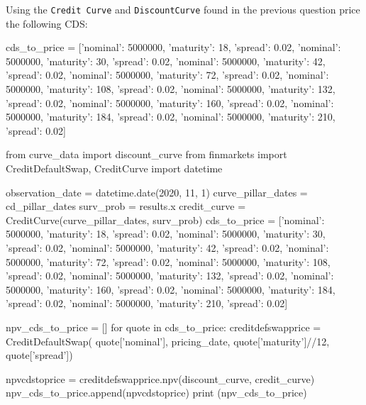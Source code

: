 \cprotEnv\begin{question}
Using the \texttt{Credit\ Curve} and \texttt{DiscountCurve} found in the previous question price the following CDS:

\begin{ipython}
cds_to_price = [{'nominal': 5000000, 'maturity': 18, 'spread': 0.02},
                {'nominal': 5000000, 'maturity': 30, 'spread': 0.02},
                {'nominal': 5000000, 'maturity': 42, 'spread': 0.02},
                {'nominal': 5000000, 'maturity': 72, 'spread': 0.02},
                {'nominal': 5000000, 'maturity': 108, 'spread': 0.02},
                {'nominal': 5000000, 'maturity': 132, 'spread': 0.02},
                {'nominal': 5000000, 'maturity': 160, 'spread': 0.02},
                {'nominal': 5000000, 'maturity': 184, 'spread': 0.02},
                {'nominal': 5000000, 'maturity': 210, 'spread': 0.02}]
\end{ipython}
\end{question}

\cprotEnv\begin{solution}
\begin{ipython}
from curve_data import discount_curve
from finmarkets import CreditDefaultSwap, CreditCurve
import datetime

observation_date = datetime.date(2020, 11, 1)
curve_pillar_dates = cd_pillar_dates
surv_prob = results.x
credit_curve = CreditCurve(curve_pillar_dates, surv_prob)
cds_to_price = [{'nominal': 5000000, 'maturity': 18, 'spread': 0.02},
                {'nominal': 5000000, 'maturity': 30, 'spread': 0.02},
                {'nominal': 5000000, 'maturity': 42, 'spread': 0.02},
                {'nominal': 5000000, 'maturity': 72, 'spread': 0.02},
                {'nominal': 5000000, 'maturity': 108, 'spread': 0.02},
                {'nominal': 5000000, 'maturity': 132, 'spread': 0.02},
                {'nominal': 5000000, 'maturity': 160, 'spread': 0.02},
                {'nominal': 5000000, 'maturity': 184, 'spread': 0.02},
                {'nominal': 5000000, 'maturity': 210, 'spread': 0.02}]

npv_cds_to_price = []
for quote in cds_to_price:
    creditdefswapprice = CreditDefaultSwap(
        quote['nominal'], pricing_date,
        quote['maturity']//12, quote['spread'])

npvcdstoprice = creditdefswapprice.npv(discount_curve, credit_curve)
npv_cds_to_price.append(npvcdstoprice)
print (npv_cds_to_price)
\end{ipython}
\begin{ioutput}
[-96879.21494231955, -125875.49083899031, -137489.2485942383,
 -150388.56810656283, -184387.14756564656, -199054.44398897374,
 -208689.7770410725, -216150.51575594302, -221690.38180709025]
\end{ioutput}
\end{solution}
